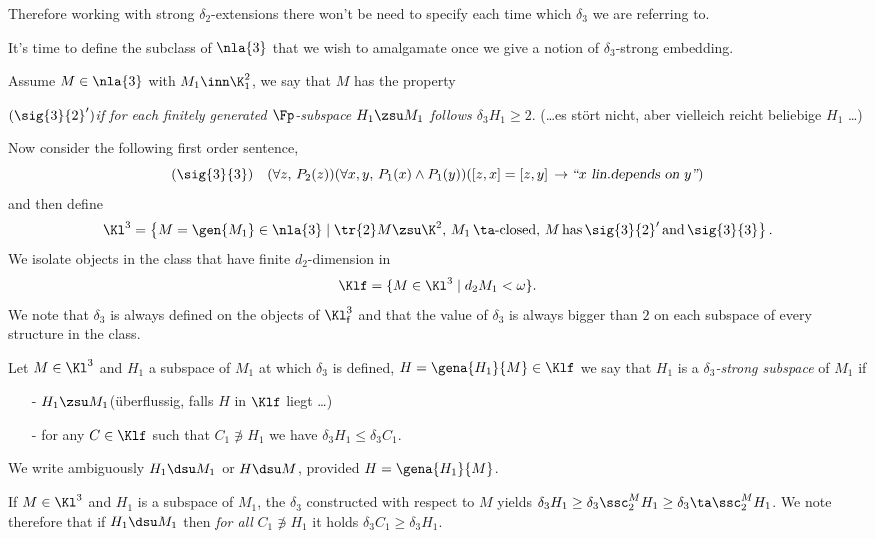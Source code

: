Therefore working with strong $\delta_{2}$-extensions there won't be need to specify
each time which $\delta_{3}$ we are referring to.

\medskip
It's time to define the subclass of $\nla{3}$ that we wish to amalgamate once we give
a notion of $\delta_{3}$-strong embedding.

Assume $M\in\nla{3}$ with $M_{1}\inn\K^{2}_{1}$, we say that $M$ has the
property %
\begin{flushleft}
$(\sig{3}{2}^{\prime})$\quad\textsl{if for each finitely generated $\Fp$-subspace $H_{1}\zsu M_{1}$ follows
$\delta_{3}H_{1}\geq2$}. (\dots es st\"ort nicht, aber vielleich reicht beliebige $H_{1}$ \dots)
\end{flushleft}

Now consider the following first order sentence,
$$(\sig{3}{3})\quad(\forall z,\,P_{2}(z))(\forall x,y,\,P_{1}(x)\wedge P_{1}(y))([z,x]=[z,y]\,\rightarrow
\textsl{``$x$ lin.{}depends on $y$''})$$
and then define
$$\Kl^{3}=\left\{
M=\gen{M_{1}}\in\nla{3}\mid
\tr{2}M\zsu\K^{2},\,M_{1}\, \ta\text{-closed},\,M\,\text{has}
\,\sig{3}{2}^{\prime}\,\text{and}\,\sig{3}{3}
\right\}.$$
We isolate objects in the class that have finite $d_{2}$-dimension in
$$\Klf=\{M\in\Kl^{3}\mid d_{2}M_{1}<\omega\}.$$
We note that $\delta_{3}$ is always defined on the objects of $\Kl^{3}_\textsf{f}$ and
that the value of $\delta_{3}$ is always bigger than $2$ on each subspace of
every structure in the class.

\begin{dfn}
Let $M\in\Kl^{3}$ and $H_{1}$ a subspace of $M_{1}$ at which $\delta_{3}$ is defined, $H=\gena{H_{1}}{M}\in\Klf$ %
we say that $H_{1}$ is a \emph{$\delta_{3}$-strong
subspace} of $M_{1}$ if 
\begin{itemize}
\item[-]$H_{1}\zsu M_{1}$\quad(\"uberflussig, falls $H$ in $\Klf$ liegt \dots)
\item[-]for any $C\in\Klf$ such that $C_{1}\nni H_{1}$ we have $\delta_{3}H_{1}\leq\delta_{3}C_{1}$.
\end{itemize}
We write ambiguously $H_{1}\dsu M_{1}$ or $H\dsu M$, provided $H=\gena{H_{1}}{M}$.
\end{dfn}
If $M\in\Kl^{3}$ and $H_{1}$ is a subspace of  $M_{1}$, the $\delta_{3}$ constructed
with respect to $M$ yields $\delta_{3}H_{1}\geq\delta_{3}\ssc^{M}_{2}H_{1}\geq\delta_{3}\ta\ssc_{2}^{M}H_{1}$. We note therefore that if $H_{1}\dsu M_{1}$ then \emph{for all} $C_{1}\nni H_{1}$ it holds
$\delta_{3}C_{1}\geq\delta_{3}H_{1}$.


